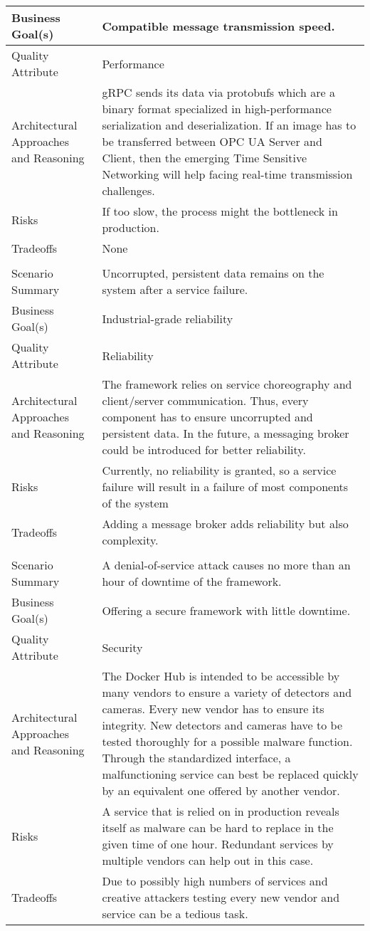 {\begin{longtable}{| P{0.2\textwidth} | P{0.74\textwidth} |}
Business Goal(s) & Compatible message transmission speed.\\ \hline
Quality Attribute & Performance\\ \hline
Architectural Approaches and Reasoning &  gRPC sends its data via protobufs which are a binary format specialized in high-performance serialization and deserialization. If an image has to be transferred between OPC UA Server and Client, then the emerging Time Sensitive Networking will help facing real-time transmission challenges.\\ \hline
Risks & If too slow, the process might the bottleneck in production.\\ \hline
Tradeoffs &  None\\ \hline
{}
 \\ \hline
Scenario Summary & Uncorrupted, persistent data remains on the system after a service failure.\\ \hline
Business Goal(s) & Industrial-grade reliability \\ \hline
Quality Attribute & Reliability\\ \hline
Architectural Approaches and Reasoning & The framework relies on service choreography and client/server communication. Thus, every component has to ensure uncorrupted and persistent data. In the future, a messaging broker could be introduced for better reliability.\\ \hline
Risks & Currently, no reliability is granted, so a service failure will result in a failure of most components of the system \\ \hline
Tradeoffs & Adding a message broker adds reliability but also complexity. \\ \hline
{}
 \\ \hline
Scenario Summary & A denial-of-service attack causes no more than an hour of downtime of the framework.\\ \hline
Business Goal(s) & Offering a secure framework with little downtime. \\ \hline
Quality Attribute & Security\\ \hline
Architectural Approaches and Reasoning & The Docker Hub is intended to be accessible by many vendors to ensure a variety of detectors and cameras. Every new vendor has to ensure its integrity. New detectors and cameras have to be tested thoroughly for a possible malware function. Through the standardized interface, a malfunctioning service can best be replaced quickly by an equivalent one offered by another vendor.\\ \hline
Risks &  A service that is relied on in production reveals itself as malware can be hard to replace in the given time of one hour. Redundant services by multiple vendors can help out in this case.\\ \hline
Tradeoffs & Due to possibly high numbers of services and creative attackers testing every new vendor and service can be a tedious task.\\ \hline
\end{longtable}
}

